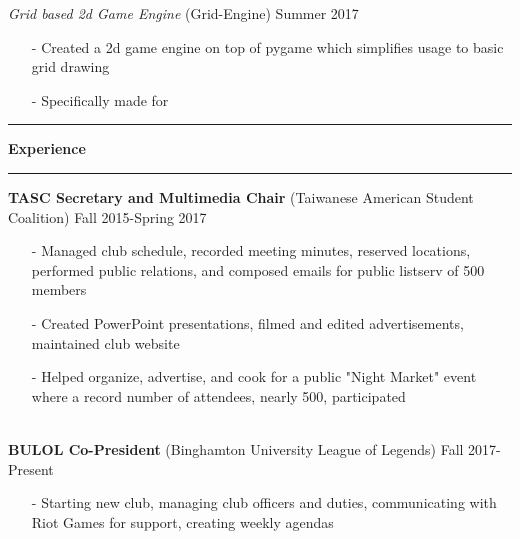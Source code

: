 \documentclass[10pt]{article}
\newcommand{\Hrule}{\vspace{0.7mm}\hrule\vspace{0.7mm}}
\newcommand{\Indent}{\indent\indent}
\begin{document}
            \Indent \small\textit{Grid based 2d Game Engine}\small{ (Grid-Engine)} \hfill \small{Summer 2017}\indent\vspace{0.5mm}\\
                \Indent\begin{minipage}{\dimexpr\textwidth-6cm}
                    \begin{itemize}[noitemsep, topsep=0pt]
                        \item[-] Created a 2d game engine on top of pygame which simplifies usage to basic grid drawing
                        \item[-] Specifically made for 
                    \end{itemize}\vspace{0mm}
                \end{minipage}
\Hrule\noindent\textbf{\normalsize Experience}\Hrule
    \indent\small{\textbf{TASC Secretary and Multimedia Chair} (Taiwanese American Student Coalition)} \hfill \small{Fall 2015-Spring 2017}\indent\vspace{0.5mm}
        \indent\begin{minipage}{\dimexpr\textwidth-6cm}
            \begin{itemize}[noitemsep, topsep=0pt]
                \item[-] Managed club schedule, recorded meeting minutes, reserved locations, performed public relations, and composed emails for public listserv of 500 members
                \item[-] Created PowerPoint presentations, filmed and edited advertisements, maintained club website
                \item[-] Helped organize, advertise, and cook for a public "Night Market" event where a record number of attendees, nearly 500, participated
            \end{itemize}\vspace{0mm}
        \end{minipage}\\
    \indent\small{\textbf{BULOL Co-President} (Binghamton University League of Legends)} \hfill \small{Fall 2017-Present}\indent\vspace{0.5mm}\\
        \indent\begin{minipage}{\dimexpr\textwidth-6cm}
            \begin{itemize}[noitemsep, topsep=0pt]
                \item[-] Starting new club, managing club officers and duties, communicating with Riot Games for support, creating weekly agendas
            \end{itemize}\vspace{0mm}
        \end{minipage}\\
\end{document}
